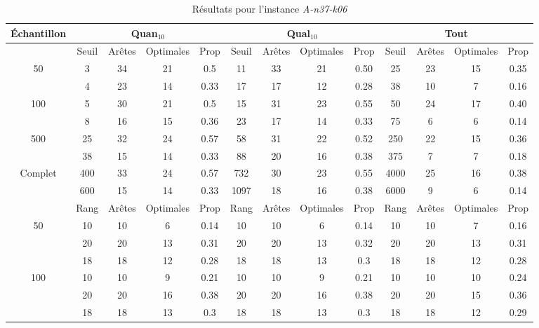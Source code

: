 \documentclass[a4paper,11pt]{article}%
\begin{document}
\begin{table}[p]
\caption{Résultats pour l'instance \emph{A-n37-k06}}
\label{T1}
\begin{center}
\begin{tabular}{|@{}c@{}|@{}c@{}|@{}c@{}|@{}c@{}|@{}c@{}||@{}c@{}|@{}c@{}|@{}c@{}|@{}c@{}||@{}c@{}|@{}c@{}|@{}c@{}|@{}c@{}|}

\hline
 Échantillon & \multicolumn{4}{c|}{Quan$_{10}$} & \multicolumn{4}{c|}{Qual$_{10}$} & \multicolumn{4}{c|}{Tout} \\
 \hline
 & Seuil & Arêtes & Optimales & Prop & Seuil & Arêtes & Optimales & Prop & Seuil & Arêtes & Optimales & Prop \\
 \hline
 50 & 3 & 34 & 21 & 0.5 & 11 & 33 & 21 & 0.50 & 25 & 23 & 15 & 0.35 \\
 \cline{2-13} 
    & 4 & 23 & 14 & 0.33 & 17 & 17 & 12 & 0.28 & 38 & 10 & 7 & 0.16 \\
  \hline
   100 & 5 & 30 & 21 & 0.5 & 15 & 31 & 23 & 0.55 & 50 & 24 & 17 & 0.40 \\
 \cline{2-13} 
    & 8 & 16 & 15 & 0.36 & 23 & 17 & 14 & 0.33 & 75 & 6 & 6 & 0.14 \\
  \hline
   500 & 25 & 32 & 24 & 0.57 & 58 & 31 & 22 & 0.52 & 250 & 22 & 15 & 0.36 \\
 \cline{2-13} 
    & 38 & 15 & 14 & 0.33 & 88 & 20 & 16 & 0.38 & 375 & 7 & 7 & 0.18 \\
  \hline
   Complet & 400 & 33 & 24 & 0.57 & 732 & 30 & 23 & 0.55 & 4000 & 25 & 16 & 0.38 \\
 \cline{2-13} 
    & 600 & 15 & 14 & 0.33 & 1097 & 18 & 16 & 0.38 & 6000 & 9 & 6 & 0.14 \\
  \hline
  \hline
 & Rang & Arêtes & Optimales & Prop & Rang&Arêtes & Optimales & Prop & Rang &Arêtes& Optimales & Prop \\
 \hline
 50 & 10 & 10 & 6 & 0.14 & 10& 10 & 6 & 0.14 & 10&10  & 7 & 0.16  \\
 \cline{2-13} 
    & 20&20 & 13 & 0.31 & 20& 20 & 13 & 0.32 & 20&20  & 13 & 0.31  \\
 \cline{2-13} 
    & 18&18 & 12 & 0.28 & 18&18 & 13 & 0.3 & 18&18 & 12 & 0.28  \\
  \hline
   100 & 10& 10 & 9 & 0.21 & 10& 10 & 9 & 0.21 & 10& 10 & 10 & 0.24  \\
 \cline{2-13} 
    & 20&20 & 16 & 0.38 & 20&20 & 16 & 0.38 & 20&20 & 15 & 0.36  \\
  \cline{2-13} 
    & 18&18 & 13 & 0.3 & 18&18 & 13 & 0.3 & 18&18 & 12 & 0.29  \\

\end{tabular}
\end{center}
\end{table}
\end{document}
